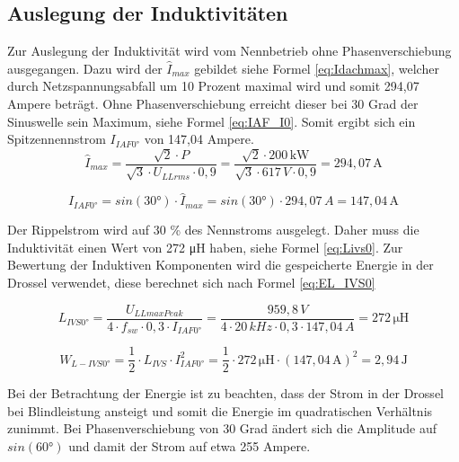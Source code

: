 	\subsection{Auslegung der Induktivitäten}
	Zur Auslegung der Induktivität wird vom Nennbetrieb ohne Phasenverschiebung ausgegangen. Dazu wird der $\hat{I}_{max}$ gebildet siehe Formel \ref{eq:Idachmax}, welcher durch Netzspannungsabfall um 10 Prozent maximal wird und somit 294,07 Ampere beträgt. Ohne Phasenverschiebung erreicht dieser bei 30 Grad der Sinuswelle sein Maximum, siehe Formel \ref{eq:IAF_I0}. Somit ergibt sich ein Spitzennennstrom $I_{IAF0°}$ von 147,04 Ampere.
	\begin{equation}
		\label{eq:Idachmax}
		\hat{I}_{max} = \dfrac{\sqrt{2} \cdot P   }{ \sqrt{3}  \cdot  U_{LLrms} \cdot 0,9} = \dfrac{\sqrt{2} \cdot 200\, \si{\kilo \watt}} { \sqrt{3} \cdot 617\, \si{V} \cdot 0,9} = 294,07\, \si{\A}
	\end{equation}
	
	\begin{equation}
		\label{eq:IAF_I0}
		I_{IAF0°}= sin(30°)\cdot \hat{I}_{max}=sin(30°)\cdot 294,07 \,A = 147,04\, \si{\A}
	\end{equation}
	
	Der Rippelstrom wird auf 30 \% des Nennstroms ausgelegt. Daher muss die Induktivität einen Wert von 272 \si{\micro \henry} haben, siehe Formel \ref{eq:Livs0}. Zur Bewertung der Induktiven Komponenten wird die gespeicherte Energie in der Drossel verwendet, diese berechnet sich nach Formel \ref{eq:EL_IVS0}
		
		\begin{equation}
			\label{eq:Livs0}
			L_{IVS0°}= \dfrac{U_{LLmaxPeak}}{4\cdot f_{sw} \cdot 0,3 \cdot I_{IAF0°}} = \dfrac{959,8\, V}{4 \cdot 20\, kHz \cdot 0,3 \cdot 147,04\, A}= 272\, \si{\micro \henry}
		\end{equation}
		
		\begin{equation}
			\label{eq:EL_IVS0}
			W_{L-IVS0°}=\dfrac{1}{2} \cdot L_{IVS} \cdot I_{IAF0°}^{2} = \dfrac{1}{2} \cdot 272\, \si{\micro \henry} \cdot (147,04\, \si{\A})^{2} =  2,94 \, \si{\joule}
		\end{equation}
		
		Bei der Betrachtung der Energie ist zu beachten, dass der Strom in der Drossel bei Blindleistung ansteigt und somit die Energie im quadratischen Verhältnis zunimmt. Bei Phasenverschiebung von 30 Grad ändert sich die Amplitude auf $sin(60°)$ und damit der Strom auf etwa 255 Ampere.
			

